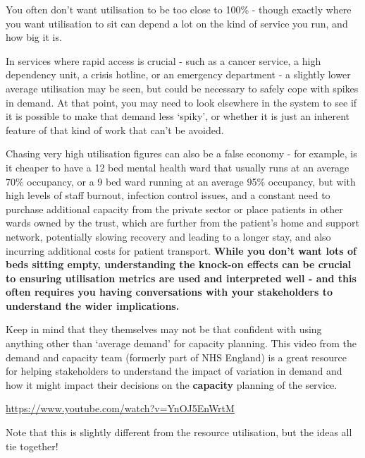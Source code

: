 \documentclass[
  letterpaper,
  DIV=11,
  numbers=noendperiod]{scrreprt}
\begin{document}
\begin{tcolorbox}[enhanced jigsaw, colframe=quarto-callout-tip-color-frame, bottomtitle=1mm, breakable, rightrule=.15mm, coltitle=black, colbacktitle=quarto-callout-tip-color!10!white, opacityback=0, leftrule=.75mm, arc=.35mm, toptitle=1mm, title=\textcolor{quarto-callout-tip-color}{\faLightbulb}\hspace{0.5em}{Tip}, titlerule=0mm, colback=white, toprule=.15mm, bottomrule=.15mm, left=2mm, opacitybacktitle=0.6]

You often don't want utilisation to be too close to 100\% - though
exactly where you want utilisation to sit can depend a lot on the kind
of service you run, and how big it is.

In services where rapid access is crucial - such as a cancer service, a
high dependency unit, a crisis hotline, or an emergency department - a
slightly lower average utilisation may be seen, but could be necessary
to safely cope with spikes in demand. At that point, you may need to
look elsewhere in the system to see if it is possible to make that
demand less `spiky', or whether it is just an inherent feature of that
kind of work that can't be avoided.

Chasing very high utilisation figures can also be a false economy - for
example, is it cheaper to have a 12 bed mental health ward that usually
runs at an average 70\% occupancy, or a 9 bed ward running at an average
95\% occupancy, but with high levels of staff burnout, infection control
issues, and a constant need to purchase additional capacity from the
private sector or place patients in other wards owned by the trust,
which are further from the patient's home and support network,
potentially slowing recovery and leading to a longer stay, and also
incurring additional costs for patient transport. \textbf{While you
don't want lots of beds sitting empty, understanding the knock-on
effects can be crucial to ensuring utilisation metrics are used and
interpreted well - and this often requires you having conversations with
your stakeholders to understand the wider implications.}

Keep in mind that they themselves may not be that confident with using
anything other than `average demand' for capacity planning. This video
from the demand and capacity team (formerly part of NHS England) is a
great resource for helping stakeholders to understand the impact of
variation in demand and how it might impact their decisions on the
\textbf{capacity} planning of the service.

\url{https://www.youtube.com/watch?v=YnOJ5EnWrtM}

Note that this is slightly different from the resource utilisation, but
the ideas all tie together!

\end{tcolorbox}
\end{document}
